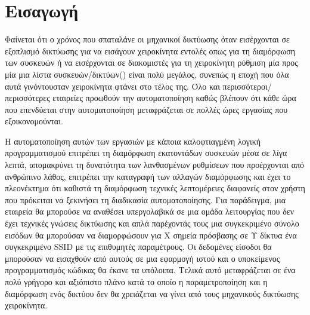\chapter{Εισαγωγή}

Φαίνεται ότι ο χρόνος που σπαταλάνε οι μηχανικοί δικτύωσης όταν εισέρχονται σε εξοπλισμό δικτύωσης για να εισάγουν χειροκίνητα εντολές οπως για τη διαμόρφωση των συσκευών ή να εισέρχονται σε διακομιστές για τη χειροκίνητη
ρύθμιση μία προς μία μια λίστα συσκευών/δικτύων() είναι πολύ μεγάλος, συνεπώς η εποχή που όλα αυτά γινόντουσταν χειροκίνητα φτάνει στο τέλος της. Όλο και περισσότεροι/περισσότερες εταιρείες προωθούν την αυτοματοποίηση καθώς βλέπουν ότι κάθε
ώρα που επενδύεται στην αυτοματοποίηση μεταφράζεται σε πολλές ώρες εργασίας που εξοικονομούνται. 

Η αυτοματοποίηση αυτών των εργασιών με κάποια καλοφτιαγμένη λογική προγραμματισμού επιτρέπει
τη διαμόρφωση εκατοντάδων συσκευών μέσα σε λίγα λεπτά, απομακρύνει τη δυνατότητα
των λανθασμένων ρυθμίσεων που προέρχονται από ανθρώπινο λάθος, επιτρέπει την καταγραφή των αλλαγών διαμόρφωσης και έχει το πλεονέκτημα ότι καθιστά τη διαμόρφωση
τεχνικές λεπτομέρειες διαφανείς στον χρήστη που πρόκειται να ξεκινήσει τη διαδικασία αυτοματοποίησης. Για παράδειγμα, μια εταιρεία θα μπορούσε να αναθέσει υπεργολαβικά σε μια ομάδα λειτουργίας
που δεν έχει τεχνικές γνώσεις δικτύωσης και απλά παρέχοντάς τους μια
συγκεκριμένο σύνολο εισόδων θα μπορούσαν να διαμορφώσουν για Χ σημεία πρόσβασης σε Υ δίκτυα
ένα συγκεκριμένο SSID με τις επιθυμητές παραμέτρους. Οι δεδομένες είσοδοι θα μπορούσαν
να εισαχθούν από αυτούς σε μια εφαρμογή ιστού και ο υποκείμενος προγραμματισμός
κώδικας θα έκανε τα υπόλοιπα. Τελικά αυτό μεταφράζεται σε ένα πολύ γρήγορο και αξιόπιστο πλάνο κατά το οποίο η παραμετροποίηση και η
διαμόρφωση ενός δικτύου δεν θα χρειάζεται να γίνει από τους μηχανικούς δικτύωσης χειροκίνητα.

